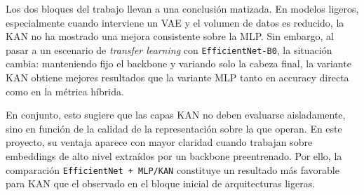 \documentclass[11pt,a4paper]{report}
\begin{document}
Los dos bloques del trabajo llevan a una conclusi\'on matizada. En modelos ligeros, especialmente cuando interviene un VAE y el volumen de datos es reducido, la KAN no ha mostrado una mejora consistente sobre la MLP. Sin embargo, al pasar a un escenario de \textit{transfer learning} con \texttt{EfficientNet-B0}, la situaci\'on cambia: manteniendo fijo el backbone y variando solo la cabeza final, la variante KAN obtiene mejores resultados que la variante MLP tanto en accuracy directa como en la m\'etrica h\'ibrida.

En conjunto, esto sugiere que las capas KAN no deben evaluarse aisladamente, sino en funci\'on de la calidad de la representaci\'on sobre la que operan. En este proyecto, su ventaja aparece con mayor claridad cuando trabajan sobre embeddings de alto nivel extra\'idos por un backbone preentrenado. Por ello, la comparaci\'on \texttt{EfficientNet + MLP/KAN} constituye un resultado m\'as favorable para KAN que el observado en el bloque inicial de arquitecturas ligeras.
\end{document}

